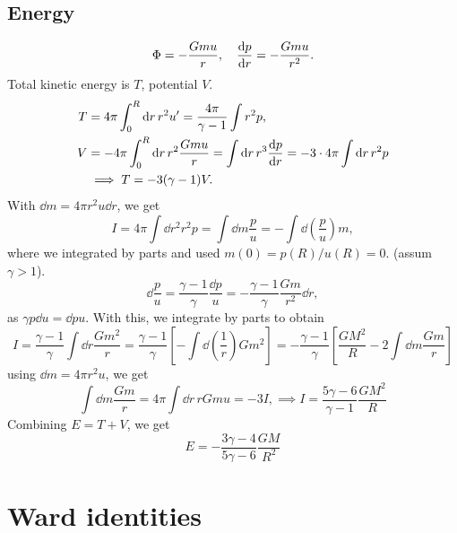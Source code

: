 \documentclass{book}
\begin{document}
\subsection{Energy}
    \begin{equation}
        \Phi = - \frac{G m u}{r}, \quad \odv{p}{r} = - \frac{G m u}{r^2}.
    \end{equation}
    Total kinetic energy is $T$, potential $V$.
    \begin{align}
        T &= 4 \pi \int_0^R\dd r\, r^2 u' = \frac{4 \pi}{\gamma - 1} \int r^2 p,\\
        V &= - 4 \pi \int_0^R \dd r \,  r^2 \frac{G m u}{r} = \int \dd r \, r^3 \odv{p}{r}
        = -3 \cdot 4 \pi \int \dd r\, r^2 p\\ 
        & \implies T = -3 (\gamma - 1) V.
    \end{align}
    With $\dd m = 4 \pi r^2 u \dd r$, we get
    \begin{equation}
        I = 4 \pi \int \dd r^2 r^2 p = \int \dd m \frac{p}{u} = - \int \dd \left(\frac{p}{u}\right) m,
    \end{equation}
    where we integrated by parts and used $m(0) = p(R)/u(R) = 0$. (assum $\gamma > 1$).
    \begin{equation}
        \dd \frac{p}{u} = \frac{\gamma - 1}{\gamma} \frac{\dd p}{u} = -\frac{\gamma - 1}{\gamma} \frac{Gm}{r^2} \dd r,
    \end{equation}
    as $\gamma p \dd u = \dd p u$. With this, we integrate by parts to obtain
    \begin{equation}
        I = \frac{\gamma - 1}{\gamma} \int \dd r \frac{G m^2}{r}
        = \frac{\gamma - 1}{\gamma} \left[  - \int \dd \left(\frac{1}{r}\right) Gm^2\right]
        = -\frac{\gamma - 1}{\gamma} \left[\frac{GM^2}{R} - 2 \int \dd m \frac{G m}{r} \right]
    \end{equation}
    using $\dd m = 4 \pi r^2 u$, we get
    \begin{equation}
        \int \dd m \frac{G m}{r} = 4\pi\int \dd r\, r G m u = -3I, \implies I = \frac{5\gamma - 6}{\gamma - 1} \frac{GM^2}{R}
    \end{equation}
    Combining $E = T + V$, we get
    \begin{equation}
        E = - \frac{3 \gamma  - 4}{5 \gamma - 6} \frac{G M}{R^2}
    \end{equation}







\section{Ward identities}
\end{document}
